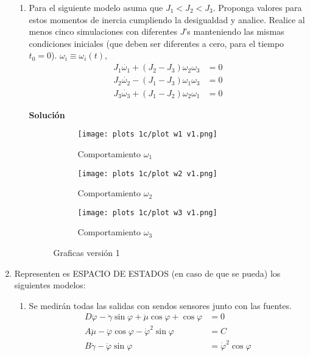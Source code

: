 \documentclass[letterpaper, 12pt]{article}
\begin{document}
\begin{enumerate}
\begin{enumerate}
\item Para el siguiente modelo asuma que $J_1 < J_2 < J_3$. Proponga valores para estos momentos de inercia cumpliendo la desigualdad y analice. Realice al menos cinco simulaciones con diferentes $J$'s manteniendo las mismas condiciones iniciales (que deben ser diferentes a cero, para el tiempo $t_0 = 0$). $\omega_i \equiv \omega_i(t)$,
\begin{equation}
\begin{split}
    J_1\dot{\omega_1} + \left( J_2 - J_3\right)\omega_2\omega_3 &= 0 \\
    J_2\dot{\omega_2} - \left( J_1 - J_3\right)\omega_1\omega_3 &= 0 \\
    J_3\dot{\omega_3} + \left( J_1 - J_2\right)\omega_2\omega_1 &= 0
\end{split}
\end{equation}

\textbf{Solución}



\begin{figure}[h!]
    \centering
    \begin{subfigure}[h]{0.28\linewidth}
        \texttt{[image: plots 1c/plot w1 v1.png]}
        \caption{Comportamiento $\omega_1$}
    \end{subfigure}
    \begin{subfigure}[h]{0.28\linewidth}
        \texttt{[image: plots 1c/plot w2 v1.png]}
        \caption{Comportamiento $\omega_2$}
    \end{subfigure}
    \begin{subfigure}[h]{0.28\linewidth}
        \texttt{[image: plots 1c/plot w3 v1.png]}
        \caption{Comportamiento $\omega_3$}
    \end{subfigure}
    \caption{Graficas versión 1}
    \label{fig:westminster}
\end{figure}






\end{enumerate}
\item Representen es ESPACIO DE ESTADOS (en caso de que se pueda) los siguientes modelos:
\begin{enumerate}
\item Se medirán todas las salidas con sendos sensores junto con las fuentes.
\begin{equation}
\begin{split}
    D\ddot{\varphi} - \ddot{\gamma}\sin \varphi + \ddot{\mu}\cos \varphi + \cos \varphi &= 0 \\
    A\ddot{\mu} - \ddot{\varphi}\cos \varphi - {\dot{\varphi}}^2\sin \varphi &= C \\
    B\ddot{\gamma} - \ddot{\varphi}\sin \varphi &= {\dot{\varphi}}^2\cos \varphi
\end{split}
\end{equation}


\end{enumerate}
\end{enumerate}
\end{document}

